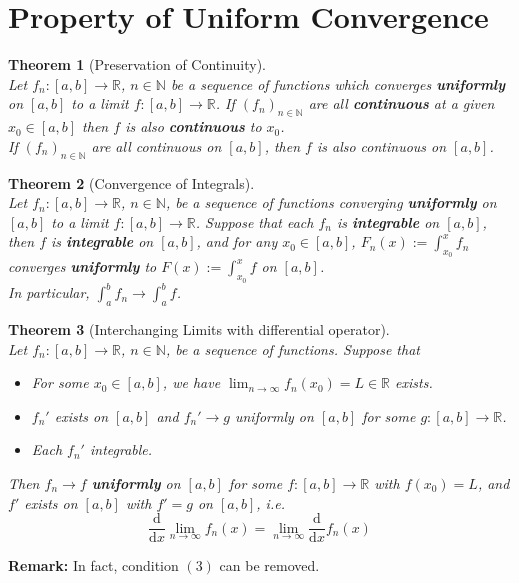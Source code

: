 \documentclass[12pt]{article}
\newcommand{\diff}{\mathrm{d}}
\newtheorem{theorem}{Theorem}[section]
\theoremstyle{definition}
\begin{document}
\section{Property of Uniform Convergence}
\begin{theorem}[Preservation of Continuity]
\hfill\\\normalfont Let $f_n:[a,b]\to\mathbb{R}$, $n\in\mathbb{N}$ be a sequence of functions which converges \textbf{uniformly} on $[a,b]$ to a limit $f:[a,b]\to\mathbb{R}$. If $(f_n)_{n\in \mathbb{N}}$ are all \textbf{continuous} at a given $x_0\in[a,b]$ then $f$ is also \textbf{continuous} to $x_0$.\\
If $(f_n)_{n\in\mathbb{N}}$ are all continuous on $[a,b]$, then $f$ is also continuous on $[a,b]$.
\end{theorem}
\begin{theorem}[Convergence of Integrals]
\hfill\\\normalfont Let $f_n:[a,b]\to\mathbb{R}$, $n\in \mathbb{N}$, be a sequence of functions converging \textbf{uniformly} on $[a,b]$ to a limit $f:[a,b]\to\mathbb{R}$. Suppose that each $f_n$ is \textbf{integrable} on $[a,b]$, then $f$ is \textbf{integrable} on $[a,b]$, and for any $x_0\in[a,b]$, $F_n(x):=\int_{x_0}^x f_n$ converges \textbf{uniformly} to $F(x):=\int_{x_0}^xf$ on $[a,b]$.\\
In particular, $\int_a^b f_n\to \int_a^b f$.
\end{theorem} 
\begin{theorem}[Interchanging Limits with differential operator]
\hfill\\\normalfont Let $f_n:[a,b]\to\mathbb{R}$, $n\in \mathbb{N}$, be a sequence of functions. Suppose that
\begin{itemize}
	\item For some $x_0\in[a,b]$, we have $\lim_{n\to\infty} f_n(x_0)=L\in\mathbb{R}$ exists.
	\item $f_n'$ exists on $[a,b]$ and $f_n'\to g$ uniformly on $[a,b]$ for some $g:[a,b]\to\mathbb{R}$.
	\item Each $f_n'$ integrable.
\end{itemize}
Then $f_n\to f$ \textbf{uniformly} on $[a,b]$ for some $f:[a,b]\to\mathbb{R}$ with $f(x_0)=L$, and $f'$ exists on $[a,b]$ with $f'=g$ on $[a,b]$, i.e.
\[
\frac{\diff}{\diff x}\lim_{n\to\infty}f_n(x)=\lim_{n\to\infty}\frac{\diff}{\diff x}f_n(x)
\]
\end{theorem}
\textbf{Remark:} In fact, condition $(3)$ can be removed.
\clearpage
\end{document}
